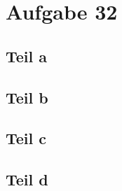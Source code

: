 \documentclass[10pt,a4paper]{article}
\begin{document}
\section{Aufgabe 32}

\subsection{Teil a}

\subsection{Teil b}

\subsection{Teil c}

\subsection{Teil d}
\end{document}

